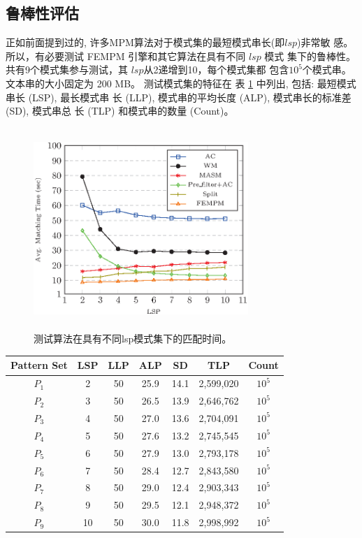 \subsection{鲁棒性评估}

正如前面提到过的, 许多MPM算法对于模式集的最短模式串长(即$lsp$)非常敏
感。 所以，有必要测试 \textsf{FEMPM} 引擎和其它算法在具有不同 $lsp$ 模式
集下的鲁棒性。 共有9个模式集参与测试，其 $lsp$从2递增到10，每个模式集都
包含$10^5$个模式串。 文本串的大小固定为 200 MB。 测试模式集的特征在
表 \ref{tab:lsps} 中列出, 包括: 最短模式串长 (LSP), 最长模式串
长 (LLP), 模式串的平均长度 (ALP), 模式串长的标准差 (SD), 模式串总
长 (TLP) 和模式串的数量 (Count)。

\begin{figure}[H]
  \centering
  \includegraphics[height=3in, width=3.2in]{figures/2_MPM/lsp}
  \caption{测试算法在具有不同lsp模式集下的匹配时间。}
  \label{fig:lsp}
\end{figure}


\begin{table}
  \centering
  \label{tab:lsps}
  \begin{tabular}{|c|c|c|c|c|c|c|}
    \hline
    Pattern Set & LSP  & LLP  & ALP & SD & TLP & Count\\
    \hline
    $P_1$ & 2 & 50 & 25.9 & 14.1 & 2,599,020 & $10^5$\\
    $P_2$ & 3 & 50 & 26.5 & 13.9 & 2,646,762 & $10^5$\\
    $P_3$ & 4 & 50 & 27.0 & 13.6 & 2,704,091 & $10^5$\\
    $P_4$ & 5 & 50 & 27.6 & 13.2 & 2,745,545 & $10^5$\\
    $P_5$ & 6 & 50 & 27.9 & 13.0 & 2,793,178 & $10^5$\\
    $P_6$ & 7 & 50 & 28.4 & 12.7 & 2,843,580 & $10^5$\\
    $P_7$ & 8 & 50 & 29.0 & 12.4 & 2,903,343 & $10^5$\\
    $P_8$ & 9 & 50 & 29.5 & 12.1 & 2,948,372 & $10^5$\\
    $P_9$ &10 & 50 & 30.0 & 11.8 & 2,998,992 & $10^5$\\
    \hline
  \end{tabular}
\end{table}


